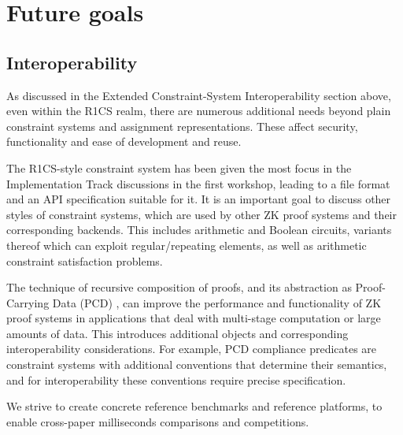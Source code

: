 \section{Future goals}
\label{implem:goals}


\subsection{Interoperability}
\label{implem:goals:interoperability}



As discussed in the Extended Constraint-System Interoperability section above, even within the R1CS realm, there are numerous additional needs beyond plain constraint systems and assignment representations. These affect security, functionality and ease of development and reuse.


The R1CS-style constraint system has been given the most focus in the Implementation Track discussions in the first workshop, leading to a file format and an API specification suitable for it.
It is an important goal to discuss other styles of constraint systems, which are used by other ZK proof systems and their corresponding backends.
This includes arithmetic and Boolean circuits, variants thereof which can exploit regular/repeating elements, as well as arithmetic constraint satisfaction problems.


The technique of recursive composition of proofs, and its abstraction as Proof-Carrying Data (PCD) 
\cite{2010:ICS:proof-carrying-data,2014:crypto:Scalable-ZK-via-Cycles-of-EC}, %
can improve the performance and functionality of ZK proof systems in applications that deal with multi-stage computation or large amounts of data.
This introduces additional objects and corresponding interoperability considerations.
For example, PCD compliance predicates are constraint systems with additional conventions that determine their semantics, and for interoperability these conventions require precise specification.


We strive to create concrete reference benchmarks and reference platforms, to enable cross-paper milliseconds comparisons and competitions.

